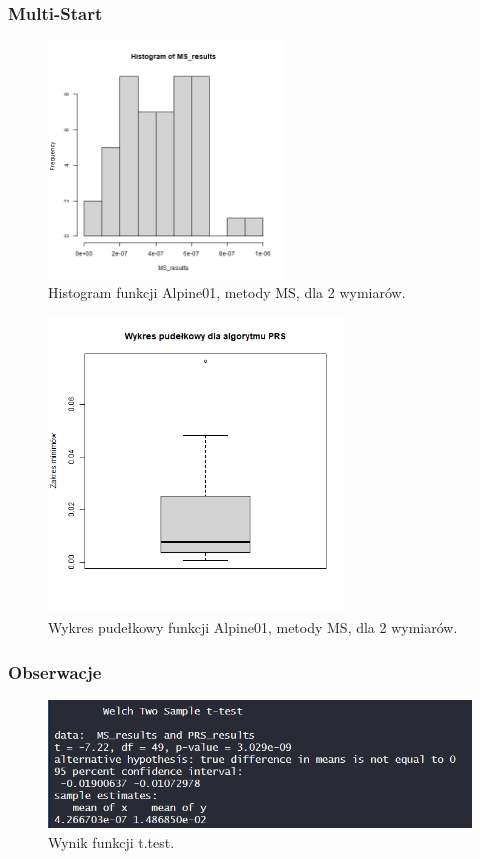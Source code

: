 \documentclass{lab}
\begin{document}
\subsubsection{Multi-Start}
\begin{figure}[H]
  \centering
  \includegraphics[width=0.56\textwidth]{img/dim2_MS_Alpine01_his.png}
  \caption{Histogram funkcji Alpine01, metody MS, dla 2 wymiarów.}
\end{figure}
\begin{figure}[H]
  \centering
  \includegraphics[width=0.7\textwidth]{img/dim2_MS_Alpine01.png}
  \caption{Wykres pudełkowy funkcji Alpine01, metody MS, dla 2 wymiarów.}
\end{figure}

\subsubsection{Obserwacje}
 \begin{figure}[H]
     \centering
     \includegraphics[width=0.9\linewidth]{img/T1.png}
     \caption{Wynik funkcji t.test.}
     \label{fig:enter-label}
 \end{figure}
\end{document}
